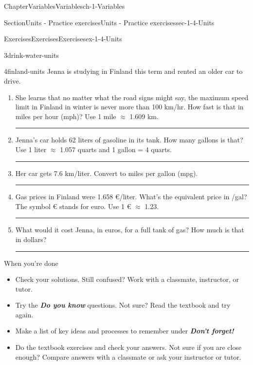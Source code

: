 \documentclass[twoside,11pt,]{book}
\newcommand{\alert}[1]{\textbf{\textit{#1}}}
\newlength{\workspacestrutwidth}
\numberwithin{equation}{section}
\begin{document}
\begin{chapterptx}{Chapter}{Variables}{}{Variables}{}{}{ch-1-Variables}
\begin{sectionptx}{Section}{Units - Practice exercises}{}{Units - Practice exercises}{}{}{sec-1-4-Units}
\begin{exercises-subsection-numberless}{Exercises}{Exercises}{}{Exercises}{}{}{ex-1-4-Units}
\begin{divisionexercise}{3}{}{}{drink-water-units}
\begin{enumerate}[label=(\alph*),ref=\alph*]
\end{enumerate}%
\end{divisionexercise}%
\clearpage
\begin{divisionexercise}{4}{}{}{finland-units}%
Jenna is studying in Finland this term and rented an older car to drive.%
\begin{enumerate}[label=(\alph*),ref=\alph*]%
\item{}She learns that no matter what the road signs might say, the maximum speed limit in Finland in winter is never more than 100 km\slash{}hr. How fast is that in miles per hour (mph)? Use 1 mile \(\approx\) 1.609 km.%
\par\rule{\workspacestrutwidth}{2.75cm}%
\item{}Jenna's car holds 62 liters of gasoline in its tank. How many gallons is that? Use 1 liter \(\approx\) 1.057 quarts and 1 gallon = 4 quarts.%
\par\rule{\workspacestrutwidth}{2.75cm}%
\item{}Her car gets 7.6 km\slash{}liter. Convert to miles per gallon (mpg).%
\par\rule{\workspacestrutwidth}{2.75cm}%
\item{}Gas prices in Finland were 1.658 €\slash{}liter. What's the equivalent price in \textdollar{}\slash{}gal? The symbol € stands for euro. Use 1 € \(\approx\) \textdollar{}1.23.%
\par\rule{\workspacestrutwidth}{2.75cm}%
\item{}What would it cost Jenna, in euros, for a full tank of gas? How much is that in dollars?%
\par\rule{\workspacestrutwidth}{2.75cm}%
\end{enumerate}%
\end{divisionexercise}%
\end{exercises-subsection-numberless}
\begin{conclusion}{When you're done \textellipsis{}}%
%
\begin{itemize}[label=\textbullet]
\item{}Check your solutions. Still confused? Work with a classmate, instructor, or tutor.%
\item{}Try the \alert{Do you know} questions. Not sure? Read the textbook and try again.%
\item{}Make a list of key ideas and processes to remember under \alert{Don't forget!}%
\item{}Do the textbook exercises and check your answers. Not sure if you are close enough? Compare answers with a classmate or ask your instructor or tutor.%

\end{itemize}
\end{conclusion}
\end{sectionptx}
\end{chapterptx}
\end{document}
